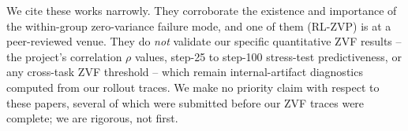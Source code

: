 We cite these works narrowly. They corroborate the existence and importance of
the within-group zero-variance failure mode, and one of them (RL-ZVP) is at a
peer-reviewed venue. They do \emph{not} validate our specific quantitative
ZVF results -- the project's correlation $\rho$ values, step-25 to step-100
stress-test predictiveness, or any cross-task ZVF threshold -- which remain
internal-artifact diagnostics computed from our rollout traces. We make no
priority claim with respect to these papers, several of which were submitted
before our ZVF traces were complete; we are rigorous, not first.


